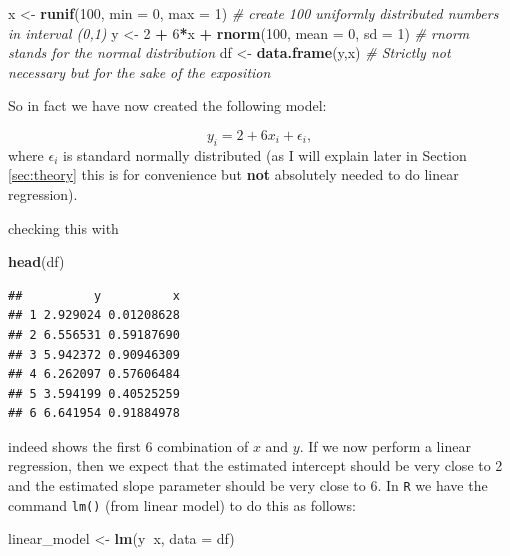 \documentclass[]{article}
\newenvironment{Shaded}{\begin{snugshade}}{\end{snugshade}}
\newcommand{\KeywordTok}[1]{\textcolor[rgb]{0.13,0.29,0.53}{\textbf{#1}}}
\newcommand{\DataTypeTok}[1]{\textcolor[rgb]{0.13,0.29,0.53}{#1}}
\newcommand{\DecValTok}[1]{\textcolor[rgb]{0.00,0.00,0.81}{#1}}
\newcommand{\StringTok}[1]{\textcolor[rgb]{0.31,0.60,0.02}{#1}}
\newcommand{\CommentTok}[1]{\textcolor[rgb]{0.56,0.35,0.01}{\textit{#1}}}
\newcommand{\OperatorTok}[1]{\textcolor[rgb]{0.81,0.36,0.00}{\textbf{#1}}}
\newcommand{\NormalTok}[1]{#1}
\theoremstyle{definition}
\theoremstyle{definition}
\theoremstyle{definition}
\theoremstyle{remark}
\begin{document}
\begin{Shaded}
\begin{Highlighting}[]
\NormalTok{x <-}\StringTok{ }\KeywordTok{runif}\NormalTok{(}\DecValTok{100}\NormalTok{, }\DataTypeTok{min =} \DecValTok{0}\NormalTok{, }\DataTypeTok{max =} \DecValTok{1}\NormalTok{) }\CommentTok{# create 100 uniformly distributed numbers in interval (0,1)}
\NormalTok{y <-}\StringTok{ }\DecValTok{2} \OperatorTok{+}\StringTok{ }\DecValTok{6}\OperatorTok{*}\NormalTok{x }\OperatorTok{+}\StringTok{ }\KeywordTok{rnorm}\NormalTok{(}\DecValTok{100}\NormalTok{, }\DataTypeTok{mean =} \DecValTok{0}\NormalTok{, }\DataTypeTok{sd =} \DecValTok{1}\NormalTok{) }\CommentTok{# rnorm stands for the normal distribution}
\NormalTok{df <-}\StringTok{ }\KeywordTok{data.frame}\NormalTok{(y,x) }\CommentTok{# Strictly not necessary but for the sake of the exposition}
\end{Highlighting}
\end{Shaded}

So in fact we have now created the following model:

\[
y_i = 2 + 6 x_i + \epsilon_i,
\] where \(\epsilon_i\) is standard normally distributed (as I will
explain later in Section \ref{sec:theory} this is for convenience but
\textbf{not} absolutely needed to do linear regression).

checking this with

\begin{Shaded}
\begin{Highlighting}[]
\KeywordTok{head}\NormalTok{(df)}
\end{Highlighting}
\end{Shaded}

\begin{verbatim}
##          y          x
## 1 2.929024 0.01208628
## 2 6.556531 0.59187690
## 3 5.942372 0.90946309
## 4 6.262097 0.57606484
## 5 3.594199 0.40525259
## 6 6.641954 0.91884978
\end{verbatim}

indeed shows the first 6 combination of \(x\) and \(y\). If we now
perform a linear regression, then we expect that the estimated intercept
should be very close to 2 and the estimated slope parameter should be
very close to 6. In \texttt{R} we have the command \texttt{lm()} (from
linear model) to do this as follows:

\begin{Shaded}
\begin{Highlighting}[]
\NormalTok{linear_model <-}\StringTok{ }\KeywordTok{lm}\NormalTok{(y}\OperatorTok{~}\NormalTok{x, }\DataTypeTok{data =}\NormalTok{ df)}
\end{Highlighting}
\end{Shaded}
\end{document}
